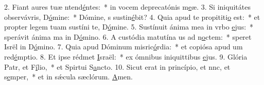 2. Fiant aures tuæ ntend\uline{é}ntes:~* in vocem deprecatónis m\uline{e}æ.
3. Si iniquitátes observávris, D\uline{ó}mine:~* Dómine, s sustin\uline{é}bit?
4. Quia apud te propititi\uline{o} est:~* et propter legem tuam sustíni te, D\uline{ó}mine.
5. Sustínuit ánima mea in vrbo \uline{e}jus:~* sperávit ánima ma in D\uline{ó}mino.
6. A custódia matutína us ad n\uline{o}ctem:~* speret Isrël in D\uline{ó}mino.
7. Quia apud Dóminum misric\uline{ó}rdia:~* et copiósa apud um red\uline{é}mptio.
8. Et ipse rédmet \uline{I}sraël:~* ex ómnibus iniquittibus \uline{e}jus.
9. Glória Patr, et F\uline{í}lio,~* et Spirtui S\uline{a}ncto.
10. Sicut erat in princípio, et nnc, et s\uline{e}mper,~* et in sǽcula sæclórum. \uline{A}men.
